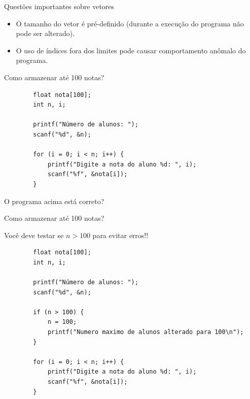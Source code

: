 \documentclass[handout]{beamer}
\begin{document}
\begin{frame}{Questões importantes sobre vetores}

    \begin{itemize}
        \item O tamanho do vetor é pré-definido (durante a execução do programa não pode ser alterado).
        \item O uso de índices fora dos limites pode causar comportamento anômalo do programa.
    \end{itemize}

\end{frame}

\begin{frame}[fragile]{Como armazenar até 100 notas?}

    \begin{verbatim}
        float nota[100];
        int n, i;

        printf("Número de alunos: ");
        scanf("%d", &n);

        for (i = 0; i < n; i++) {
            printf("Digite a nota do aluno %d: ", i);
            scanf("%f", &nota[i]);
        }
    \end{verbatim}

    O programa acima está correto?

\end{frame}

\begin{frame}[fragile]{Como armazenar até 100 notas?}

    Você deve testar se $n>100$ para evitar erros!!

    \begin{verbatim}
        float nota[100];
        int n, i;

        printf("Número de alunos: ");
        scanf("%d", &n);

        if (n > 100) {
            n = 100;
            printf("Numero maximo de alunos alterado para 100\n");
        }

        for (i = 0; i < n; i++) {
            printf("Digite a nota do aluno %d: ", i);
            scanf("%f", &nota[i]);
        }
    \end{verbatim}

\end{frame}

\end{document}
